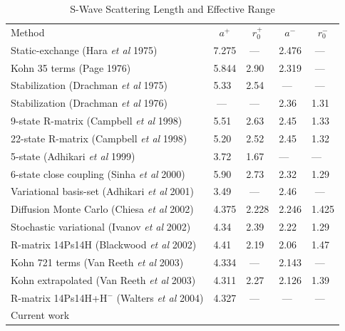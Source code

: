 \documentclass[preprint,showpacs,preprintnumbers,amsmath,amssymb]{revtex4}
\begin{document}
\begin{table}[H]
\begin{center}
\begin{ruledtabular}
\begin{tabular}{l l l l l}
Method & \multicolumn{1}{c}{$a^+$} & \multicolumn{1}{c}{$r_0^+$} & \multicolumn{1}{c}{$a^-$} & \multicolumn{1}{c}{$r_0^-$}\\
\colrule
Static-exchange (Hara \emph{et al} 1975) \cite{Hara1975} & 7.275 & \,\,--- & 2.476 & \,\,--- \\
Kohn 35 terms (Page 1976) \cite{Page1976} & 5.844 & 2.90 & 2.319 & \,\,--- \\
Stabilization (Drachman \emph{et al} 1975) \cite{Drachman1975} & 5.33 & 2.54 & \,\,--- & \,\,--- \\
Stabilization (Drachman \emph{et al} 1976) \cite{Drachman1976} & \,\,--- & \,\,--- & 2.36 & 1.31 \\
9-state R-matrix (Campbell \emph{et al} 1998) \cite{Campbell1998} & 5.51 & 2.63 & 2.45 & 1.33 \\
22-state R-matrix (Campbell \emph{et al} 1998) \cite{Campbell1998} & 5.20 & 2.52 & 2.45 & 1.32 \\
5-state (Adhikari \emph{et al} 1999) \cite{Adhikari1999} & 3.72 & 1.67 & --- & --- \\
6-state close coupling (Sinha \emph{et al} 2000) \cite{Sinha2000} & 5.90 & 2.73 & 2.32 & 1.29 \\
Variational basis-set (Adhikari \emph{et al} 2001) \cite{Adhikari2001b} & 3.49 & \,\,--- & 2.46 & \,\,--- \\
Diffusion Monte Carlo (Chiesa \emph{et al} 2002) \cite{Chiesa2002} & 4.375 & 2.228 & 2.246 & 1.425 \\
Stochastic variational (Ivanov \emph{et al} 2002) \cite{Ivanov2002} & 4.34 & 2.39 & 2.22 & 1.29 \\
R-matrix 14Ps14H (Blackwood \emph{et al} 2002) \cite{Blackwood2002} & 4.41 & 2.19 & 2.06 & 1.47 \\
Kohn 721 terms (Van Reeth \emph{et al} 2003) \cite{VanReeth2003} & 4.334 & \,\,--- & 2.143 & \,\,--- \\
Kohn extrapolated (Van Reeth \emph{et al} 2003) \cite{VanReeth2003} & 4.311 & 2.27 & 2.126 & 1.39 \\
R-matrix 14Ps14H+H$^-$ (Walters \emph{et al} 2004) \cite{Blackwood2002} & 4.327 & \,\,--- & \,\,--- & \,\,--- \\
Current work & & & & \\
\end{tabular}
\end{ruledtabular}
\caption{S-Wave Scattering Length and Effective Range}
\label{tab:SWaveScatLenOther}
\end{center}
\end{table}
\end{document}
